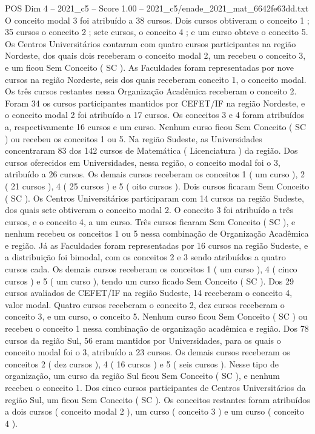 \begin{textsample}{POS Dim 4 – 2021\_c5 – Score 1.00 – 2021\_c5/enade\_2021\_mat\_6642fe63dd.txt}
O conceito modal 3 foi atribuído a 38 cursos.
Dois cursos obtiveram o conceito 1 ; 35 cursos o conceito 2 ; sete cursos, o conceito 4 ; e um curso obteve o conceito 5.
Os Centros Universitários contaram com quatro cursos participantes na região Nordeste, dos quais dois receberam o conceito modal 2, um recebeu o conceito 3, e um ficou Sem Conceito ( SC ).
As Faculdades foram representadas por nove cursos na região Nordeste, seis dos quais receberam conceito 1, o conceito modal.
Os três cursos restantes nessa Organização Acadêmica receberam o conceito 2.
Foram 34 os cursos participantes mantidos por CEFET/IF na região Nordeste, e o conceito modal 2 foi atribuído a 17 cursos.
Os conceitos 3 e 4 foram atribuídos a, respectivamente 16 cursos e um curso.
Nenhum curso ficou Sem Conceito ( SC ) ou recebeu os conceitos 1 ou 5.
Na região Sudeste, as Universidades concentraram 83 dos 142 cursos de Matemática ( Licenciatura ) da região.
Dos cursos oferecidos em Universidades, nessa região, o conceito modal foi o 3, atribuído a 26 cursos.
Os demais cursos receberam os conceitos 1 ( um curso ), 2 ( 21 cursos ), 4 ( 25 cursos ) e 5 ( oito cursos ).
Dois cursos ficaram Sem Conceito ( SC ).
Os Centros Universitários participaram com 14 cursos na região Sudeste, dos quais sete obtiveram o conceito modal 2.
O conceito 3 foi atribuído a três cursos, e o conceito 4, a um curso.
Três cursos ficaram Sem Conceito ( SC ), e nenhum recebeu os conceitos 1 ou 5 nessa combinação de Organização Acadêmica e região.
Já as Faculdades foram representadas por 16 cursos na região Sudeste, e a distribuição foi bimodal, com os conceitos 2 e 3 sendo atribuídos a quatro cursos cada.
Os demais cursos receberam os conceitos 1 ( um curso ), 4 ( cinco cursos ) e 5 ( um curso ), tendo um curso ficado Sem Conceito ( SC ).
Dos 29 cursos avaliados de CEFET/IF na região Sudeste, 14 receberam o conceito 4, valor modal.
Quatro cursos receberam o conceito 2, dez cursos receberam o conceito 3, e um curso, o conceito 5.
Nenhum curso ficou Sem Conceito ( SC ) ou recebeu o conceito 1 nessa combinação de organização acadêmica e região.
Dos 78 cursos da região Sul, 56 eram mantidos por Universidades, para os quais o conceito modal foi o 3, atribuído a 23 cursos.
Os demais cursos receberam os conceitos 2 ( dez cursos ), 4 ( 16 cursos ) e 5 ( seis cursos ).
Nesse tipo de organização, um curso da região Sul ficou Sem Conceito ( SC ), e nenhum recebeu o conceito 1.
Dos cinco cursos participantes de Centros Universitários da região Sul, um ficou Sem Conceito ( SC ).
Os conceitos restantes foram atribuídos a dois cursos ( conceito modal 2 ), um curso ( conceito 3 ) e um curso ( conceito 4 ).

\end{textsample}
